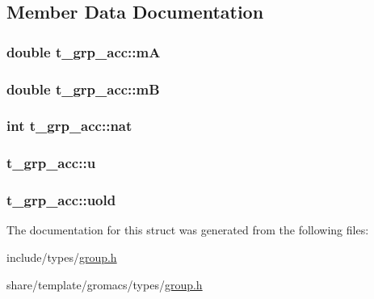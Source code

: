 \subsection{\-Member \-Data \-Documentation}
\hypertarget{structt__grp__acc_a0635e7557c11354f4883645d45102a46}{
\subsubsection[{m\-A}]{\setlength{\rightskip}{0pt plus 5cm}double {\bf t\-\_\-grp\-\_\-acc\-::m\-A}}}\label{structt__grp__acc_a0635e7557c11354f4883645d45102a46}
\hypertarget{structt__grp__acc_a54b00e38ec0a72f808ef5a143b03813d}{
\subsubsection[{m\-B}]{\setlength{\rightskip}{0pt plus 5cm}double {\bf t\-\_\-grp\-\_\-acc\-::m\-B}}}\label{structt__grp__acc_a54b00e38ec0a72f808ef5a143b03813d}
\hypertarget{structt__grp__acc_a1787266b47365154710d92ad74dcc1d5}{
\subsubsection[{nat}]{\setlength{\rightskip}{0pt plus 5cm}int {\bf t\-\_\-grp\-\_\-acc\-::nat}}}\label{structt__grp__acc_a1787266b47365154710d92ad74dcc1d5}
\hypertarget{structt__grp__acc_a06bab7de566adca48c7cf3da981e5107}{
\subsubsection[{u}]{ {\bf t\-\_\-grp\-\_\-acc\-::u}}}\label{structt__grp__acc_a06bab7de566adca48c7cf3da981e5107}
\hypertarget{structt__grp__acc_ace4b9cbda4532c0ec585e9b0376102a2}{
\subsubsection[{uold}]{ {\bf t\-\_\-grp\-\_\-acc\-::uold}}}\label{structt__grp__acc_ace4b9cbda4532c0ec585e9b0376102a2}


\-The documentation for this struct was generated from the following files\-:\begin{DoxyCompactItemize}
\item 
include/types/\hyperlink{include_2types_2group_8h}{group.\-h}\item 
share/template/gromacs/types/\hyperlink{share_2template_2gromacs_2types_2group_8h}{group.\-h}\end{DoxyCompactItemize}

